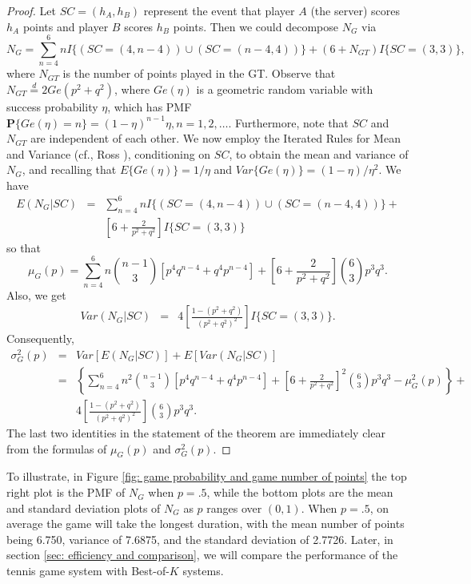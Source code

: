 \documentclass[11pt]{article}
\theoremstyle{plain}
\theoremstyle{definition}
\renewcommand{\Pr}{\mathbf{P}}
\begin{document}
\begin{proof}
    Let $SC = (h_A,h_B)$ represent the event that player $A$ (the server) scores $h_A$ points and player $B$ scores $h_B$ points. Then we could decompose $N_G$ via
    $$N_G = \sum_{n=4}^6 n I\{(SC=(4,n-4)) \cup (SC=(n-4,4))\} + (6 + N_{GT}) I\{SC=(3,3)\},$$
    where $N_{GT}$ is the number of points played in the GT. Observe that $N_{GT} \stackrel{d}{=} 2Ge(p^2+q^2)$, where $Ge(\eta)$ is a geometric random variable with success probability $\eta$, which has PMF $\Pr\{Ge(\eta) = n\} = (1-\eta)^{n-1} \eta, n=1,2,\ldots$. Furthermore, note that $SC$ and $N_{GT}$ are independent of each other. We now employ the Iterated Rules for Mean and Variance (cf., Ross \cite{Ross1998}), conditioning on $SC$, to obtain the mean and variance of $N_G$, and recalling that
    $E\{Ge(\eta)\} = {1}/{\eta}$ and $Var\{Ge(\eta)\} = {(1-\eta)}/{\eta^2}.$
    We have
     \begin{eqnarray*} E(N_G|SC) & = & \sum_{n=4}^6 n I\{(SC=(4,n-4)) \cup (SC=(n-4,4))\} + \\ && \left[6 + \frac{2}{p^2+q^2}\right] I\{SC=(3,3)\}
    \end{eqnarray*}
   so that
    $$\mu_G(p) = \sum_{n=4}^6 n {{n-1} \choose 3} \left[p^4q^{n-4} + q^4p^{n-4}\right] +
    \left[6 + \frac{2}{p^2+q^2}\right] {6 \choose 3} p^3q^3.$$
    Also, we get 
    \begin{eqnarray*} 
    Var(N_G|SC) & = & 4\left[\frac{1-(p^2+q^2)}{(p^2+q^2)^2}\right] I\{SC=(3,3)\}.
    \end{eqnarray*}
    Consequently,
    \begin{eqnarray*}
        \sigma_G^2(p) & = & Var[E(N_G|SC)] + E[Var(N_G|SC)] \\
        & = & \left\{ \sum_{n=4}^6 n^2 {{n-1} \choose 3} \left[p^4q^{n-4} + q^4p^{n-4}\right] + \left[6 + \frac{2}{p^2+q^2}\right]^2 {6 \choose 3} p^3q^3 - \mu_G^2(p)\right\} + \\
        && 4 \left[\frac{1-(p^2+q^2)}{(p^2+q^2)^2}\right] {6 \choose 3} p^3q^3.
    \end{eqnarray*}
    The last two identities in the statement of the theorem are immediately clear from the formulas of $\mu_G(p)$ and $\sigma_G^2(p)$.
\end{proof}
%

To illustrate, in Figure \ref{fig: game probability and game number of points} the top right plot is the PMF of $N_G$ when $p = .5$, while the bottom plots are the mean and standard deviation plots of $N_G$ as $p$ ranges over $(0,1)$. When $p = .5$, on average the game will take the longest duration, with the mean number of points being 6.750, variance of 7.6875, and the standard deviation of 2.7726. Later, in section \ref{sec: efficiency and comparison}, we will compare the performance of the tennis game system with Best-of-$K$ systems.
%
\end{document}
